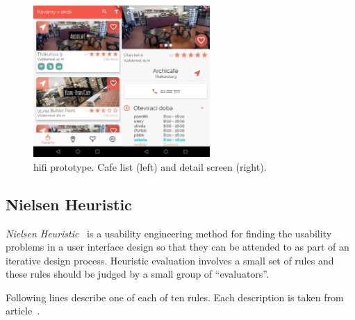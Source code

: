 \begin{figure}[htp]
    \centering
    \includegraphics[width=0.6\textwidth]{img/analysis/hifi.jpg}
    \caption{\gls{hifi} prototype. Cafe list (left) and detail screen (right).}
    \label{fig:hifi}
\end{figure}

\subsection{Nielsen Heuristic}
\textit{Nielsen Heuristic}~\cite{nielsen} is a usability engineering method for finding the usability problems in a user interface design so that they can be attended to as part of an iterative design process. Heuristic evaluation involves a small set of rules and these rules should be judged by a small group of ``evaluators''.

Following lines describe one of each of ten rules. Each description is taken from article~\cite{nielsen}.

